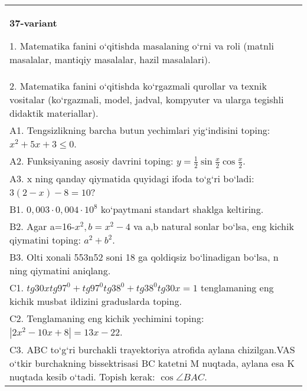 \documentclass{article}
\begin{document}
\begin{tabular}{m{17cm}}
\textbf{37-variant}

1. Matematika fanini o‘qitishda masalaning o‘rni va roli (matnli masalalar, mantiqiy masalalar, hazil masalalari). \\
2. Matematika fanini o‘qitishda ko‘rgazmali qurollar va texnik vositalar (ko‘rgazmali, model, jadval, kompyuter va ularga tegishli didaktik materiallar). \\
A1. Tengsizlikning barcha butun yechimlari yig‘indisini toping: \(x^2 + 5x + 3 \leq 0\). \\
A2. Funksiyaning asosiy davrini toping: \(y = \frac{1}{2}\sin{\frac{x}{2}\cos\frac{x}{2}}\). \\
A3. x ning qanday qiymatida quyidagi ifoda to‘g‘ri bo‘ladi: \(3 (2 - x) - 8 = 10\)? \\
B1. \(0,003 \cdot 0,004 \cdot 10^{8}\) ko‘paytmani standart shaklga keltiring. \\
B2. Agar a=16-\(x^2, b=x^2-4\) va a,b natural sonlar bo‘lsa, eng kichik qiymatini toping: \(a^2 + b^2\). \\
B3. Olti xonali 553n52 soni 18 ga qoldiqsiz bo‘linadigan bo‘lsa, n ning qiymatini aniqlang. \\
C1. \(tg30xtg97^{0} + tg97^{0}tg38^{0} + tg38^{0}tg30x = 1\) tenglamaning eng kichik musbat ildizini graduslarda toping. \\
C2. Tenglamaning eng kichik yechimini toping: \(\left| 2x^2 - 10x + 8 \right| = 13x - 22\). \\
C3. ABC to‘g‘ri burchakli trayektoriya atrofida aylana chizilgan.VAS o‘tkir burchakning bissektrisasi BC katetni M nuqtada, aylana esa K nuqtada kesib o‘tadi. Topish kerak: \(\cos\angle BAC\). \\

\end{tabular}
\vspace{1cm}
\end{document}
